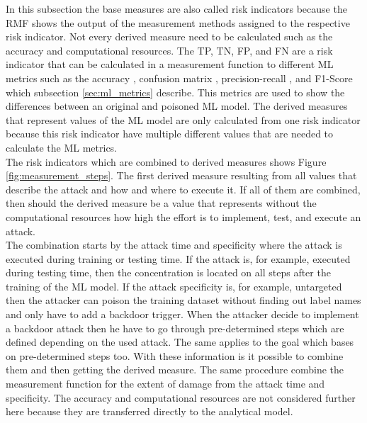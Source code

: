 In this subsection the base measures are also called risk indicators because the RMF shows the output of the measurement methods assigned to the respective risk indicator. Not every derived measure need to be calculated such as the accuracy and computational resources. The TP, TN, FP, and FN are a risk indicator that can be calculated in a measurement function to different ML metrics such as the accuracy \cite{9783960101925}, confusion matrix \cite{DBLP:journals/isci/XuZM20}, precision-recall \cite{DBLP:conf/icml/DavisG06}, and F1-Score
\cite{9783960101925} which subsection \ref{sec:ml_metrics} describe. This metrics are used to show the differences between an original and poisoned ML model. The derived measures that represent values of the ML model are only calculated from one risk indicator because this risk indicator have multiple different values that are needed to calculate the ML metrics. \\
The risk indicators which are combined to derived measures shows Figure \ref{fig:measurement_steps}. The first derived measure resulting from all values that describe the attack and how and where to execute it. If all of them are combined, then should the derived measure be a value that represents without the computational resources how high the effort is to implement, test, and execute an attack. \\
The combination starts by the attack time and specificity where the attack is executed during training or testing time. If the attack is, for example, executed during testing time, then the concentration is located on all steps after the training of the ML model. If the attack specificity is, for example, untargeted then the attacker can poison the training dataset without finding out label names and only have to add a backdoor trigger. When the attacker decide to implement a backdoor attack then he have to go through pre-determined steps which are defined depending on the used attack. The same applies to the goal which bases on pre-determined steps too. With these information is it possible to combine them and then getting the derived measure. The same procedure combine the measurement function for the extent of damage from the attack time and specificity. The accuracy and computational resources are not considered further here because they are transferred directly to the analytical model.

